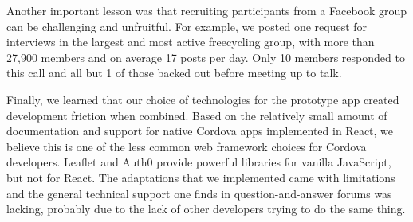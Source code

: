 Another important lesson was that recruiting participants from a Facebook group can be challenging and unfruitful. For example, we posted one request for interviews in the largest and most active freecycling group, with more than 27,900 members and on average 17 posts per day. Only 10 members responded to this call and all but 1 of those backed out before meeting up to talk.

Finally, we learned that our choice of technologies for the prototype app created development friction when combined. Based on the relatively small amount of documentation and support for native Cordova apps implemented in React, we believe this is one of the less common web framework choices for Cordova developers. Leaflet and Auth0 provide powerful libraries for vanilla JavaScript, but not for React. The adaptations that we implemented came with limitations and the general technical support one finds in question-and-answer forums was lacking, probably due to the lack of other developers trying to do the same thing.


